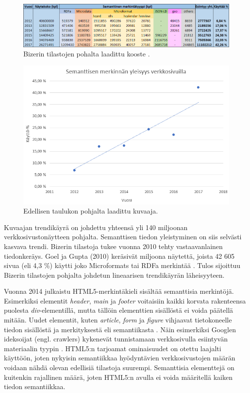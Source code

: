 \documentclass[finnish, 12pt, a4paper, elec, utf8, pdfa, online]{aaltothesis}
\begin{document}
{\begin{figure}[htb]
\centering
\includegraphics[width=15cm]{images/taulukko.png}
\caption{Bizerin tilastojen pohalta laadittu kooste \cite{rdfa_usage}. \label{images/taulukko}}
\end{figure}

\begin{figure}[htb]
\centering
\includegraphics[width=13cm]{images/verkkosivut.png}
\caption{Edellisen taulukon pohjalta laadittu kuvaaja. \label{images/verkkosivut}}
\end{figure}
\clearpage

Kuvaajan trendikäyrä on johdettu yhteensä yli 140 miljoonan verkkosivustonäytteen pohjalta. Semanttisen tiedon yleistyminen on siis selvästi kasvava trendi. Bizerin tilastoja tukee vuonna 2010 tehty vastaavanlainen tiedonkeräys. Goel ja Gupta (2010) keräsivät miljoona näytettä, joista 42 605 sivua (eli 4,3 \%) käytti joko Microformats tai RDFa merkintää \cite{Google}. Tulos sijoittuu Bizerin tilastojen pohjalta johdetun lineaarisen trendikäyrän läheisyyteen.

Vuonna 2014 julkaistu HTML5-merkintäkieli sisältää semanttisia merkintöjä. Esimerkiksi elementit \textit{header}, \textit{main} ja \textit{footer} voitaisiin kaikki korvata rakenteensa puolesta \textit{div}-elementillä, mutta tällöin elementtien sisällöstä ei voida päätellä mitään. Uudet elementit, kuten \textit{article}, \textit{form} ja \textit{figure} vihjaavat tietokoneelle tiedon sisällöstä ja merkityksestä eli semantiikasta \cite{html5}. Näin esimerkiksi Googlen ideksoijat (engl. crawlers) kykenevät tunnistamaan verkkosivulla esiintyvän materiaalin tyypin \cite{html5}. HTML5:n tarjoamat ominaisuudet on otettu laajalti käyttöön, joten nykyisin semantiikkaa hyödyntävien verkkosivustojen määrän voidaan nähdä olevan edellisiä tilastoja suurempi. Semanttisia elementtejä on kuitenkin rajallinen määrä, joten HTML5:n avulla ei voida määritellä kaiken tiedon semantiikkaa.

}
\end{document}

